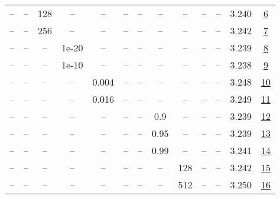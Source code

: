 \begin{table}[H]
\begin{tabular}{ccccccccccccc}
-- & -- & 128 & -- & -- & -- & -- & -- & -- & -- & -- & 3.240 & \href{https://wandb.ai/stanford-mercury/optimizer-scaling/runs/sweep-130m-21B-soapebbce2flr0.008-wd0.1-minlr0-warmup1000-b10.95-d9c8f1}{6} \\
-- & -- & 256 & -- & -- & -- & -- & -- & -- & -- & -- & 3.242 & \href{https://wandb.ai/stanford-mercury/optimizer-scaling/runs/sweep-130m-21B-soape0e8fddlr0.008-wd0.1-minlr0-warmup1000-b10.95-b0e218}{7} \\
-- & -- & -- & 1e-20 & -- & -- & -- & -- & -- & -- & -- & 3.239 & \href{https://wandb.ai/stanford-mercury/optimizer-scaling/runs/sweep-130m-21B-soape90bb59lr0.008-wd0.1-minlr0-warmup1000-b10.95-8dbf93}{8} \\
-- & -- & -- & 1e-10 & -- & -- & -- & -- & -- & -- & -- & 3.238 & \href{https://wandb.ai/stanford-mercury/optimizer-scaling/runs/sweep-130m-21B-soape764fd7lr0.008-wd0.1-minlr0-warmup1000-b10.95-e02893}{9} \\
-- & -- & -- & -- & 0.004 & -- & -- & -- & -- & -- & -- & 3.248 & \href{https://wandb.ai/stanford-mercury/optimizer-scaling/runs/sweep-130m-21B-soapea6eb5clr0.004-wd0.1-minlr0-warmup1000-b10.95-8a2995}{10} \\
-- & -- & -- & -- & 0.016 & -- & -- & -- & -- & -- & -- & 3.249 & \href{https://wandb.ai/stanford-mercury/optimizer-scaling/runs/sweep-130m-21B-soapeb1fde6lr0.016-wd0.1-minlr0-warmup1000-b10.95-5f7cea}{11} \\
-- & -- & -- & -- & -- & -- & -- & 0.9 & -- & -- & -- & 3.239 & \href{https://wandb.ai/stanford-mercury/optimizer-scaling/runs/sweep-130m-21B-soape79ae56lr0.008-wd0.1-minlr0-warmup1000-b10.95-0877bc}{12} \\
-- & -- & -- & -- & -- & -- & -- & 0.95 & -- & -- & -- & 3.239 & \href{https://wandb.ai/stanford-mercury/optimizer-scaling/runs/sweep-130m-21B-soape3988b4lr0.008-wd0.1-minlr0-warmup1000-b10.95-e19da4}{13} \\
-- & -- & -- & -- & -- & -- & -- & 0.99 & -- & -- & -- & 3.241 & \href{https://wandb.ai/stanford-mercury/optimizer-scaling/runs/sweep-130m-21B-soape71bf2dlr0.008-wd0.1-minlr0-warmup1000-b10.95-76d2e8}{14} \\
-- & -- & -- & -- & -- & -- & -- & -- & 128 & -- & -- & 3.242 & \href{https://wandb.ai/stanford-mercury/optimizer-scaling/runs/sweep-130m-21B-soape621149lr0.008-wd0.1-minlr0-warmup1000-b10.95-3bf74a}{15} \\
-- & -- & -- & -- & -- & -- & -- & -- & 512 & -- & -- & 3.250 & \href{https://wandb.ai/stanford-mercury/optimizer-scaling/runs/sweep-130m-21B-soape63e5b5lr0.008-wd0.1-minlr0-warmup1000-b10.95-1d80c0}{16} \\

\end{tabular}
\end{table}
